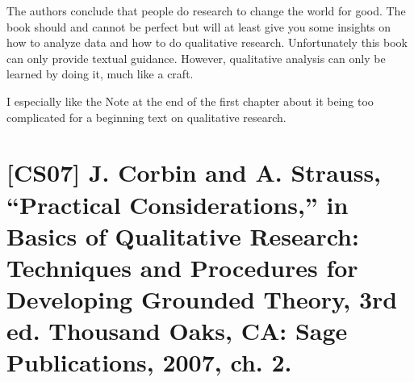 \documentclass[a4paper,12pt,english]{scrartcl}
\newcommand{\papertitle}[2]{
	\section{[#1] #2}
}
\begin{document}
The authors conclude that people do research to change the world for good. The book should and cannot be perfect but will at least give you some insights on how to analyze data and how to do qualitative research. Unfortunately this book can only provide textual guidance. However, qualitative analysis can only be learned by doing it, much like a craft.

{\tiny I especially like the Note at the end of the first chapter about it being too complicated for a beginning text on qualitative research.}

\newpage

\papertitle{CS07}{J. Corbin and A. Strauss, \enquote{Practical Considerations,} in Basics of Qualitative Research: Techniques and Procedures for Developing Grounded Theory, 3rd ed. Thousand Oaks, CA: Sage Publications, 2007, ch. 2.}
\end{document}
